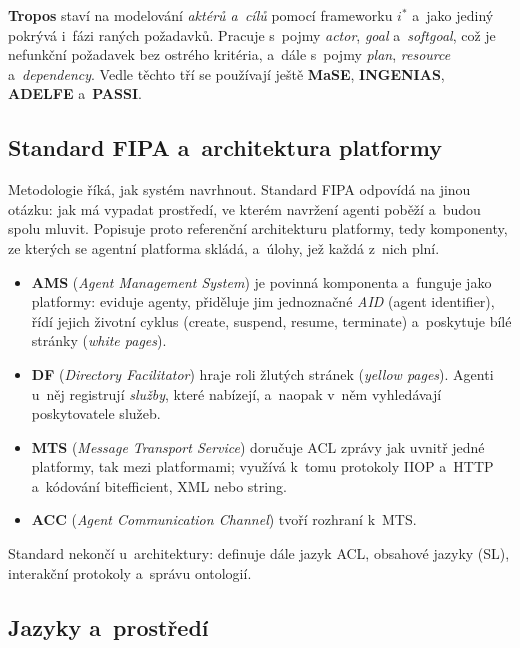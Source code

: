 \documentclass[11pt,a4paper]{article}
\theoremstyle{definition}
\begin{document}
\textbf{Tropos} staví na modelování \emph{aktérů a~cílů} pomocí frameworku $i^*$ a~jako jediný
pokrývá i~fázi raných požadavků. Pracuje s~pojmy \emph{actor}, \emph{goal} a~\emph{softgoal},
což je nefunkční požadavek bez ostrého kritéria, a~dále s~pojmy \emph{plan}, \emph{resource}
a~\emph{dependency}. Vedle těchto tří se používají ještě \textbf{MaSE}, \textbf{INGENIAS},
\textbf{ADELFE} a~\textbf{PASSI}.

\subsection{Standard FIPA a~architektura platformy}

Metodologie říká, jak systém navrhnout. Standard FIPA odpovídá na jinou otázku: jak má vypadat
prostředí, ve kterém navržení agenti poběží a~budou spolu mluvit. Popisuje proto referenční
architekturu platformy, tedy komponenty, ze kterých se agentní platforma skládá, a~úlohy,
jež každá z~nich plní.

\begin{defbox}
\begin{itemize}
\item \textbf{AMS} (\emph{Agent Management System}) je povinná komponenta a~funguje jako
   platformy: eviduje agenty, přiděluje jim jednoznačné \emph{AID}
  (agent identifier), řídí jejich životní cyklus (create, suspend, resume, terminate)
  a~poskytuje bílé stránky (\emph{white pages}).
\item \textbf{DF} (\emph{Directory Facilitator}) hraje roli žlutých stránek
  (\emph{yellow pages}). Agenti u~něj registrují \emph{služby}, které nabízejí, a~naopak
  v~něm vyhledávají poskytovatele služeb.
\item \textbf{MTS} (\emph{Message Transport Service}) doručuje ACL zprávy jak uvnitř jedné
  platformy, tak mezi platformami; využívá k~tomu protokoly IIOP a~HTTP a~kódování
  bitefficient, XML nebo string.
\item \textbf{ACC} (\emph{Agent Communication Channel}) tvoří rozhraní k~MTS.
\end{itemize}
Standard nekončí u~architektury: definuje dále jazyk ACL, obsahové jazyky (SL), interakční
protokoly a~správu ontologií.
\end{defbox}

\subsection{Jazyky a~prostředí}
\label{ssec:jazyky}
\end{document}
